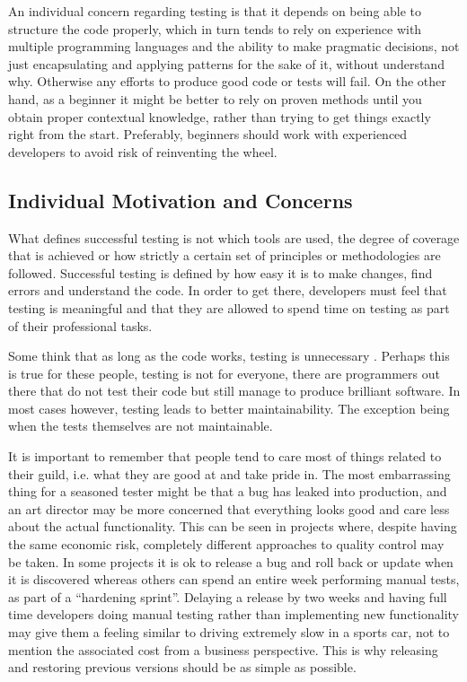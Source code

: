 \documentclass[11pt]{article}
\begin{document}
An individual concern regarding testing is that it depends on being able to structure the code properly, which in turn tends to rely on experience with multiple programming languages and the ability to make pragmatic decisions, not just encapsulating and applying patterns for the sake of it, without understand why. Otherwise any efforts to produce good code or tests will fail. %
On the other hand, as a beginner it might be better to rely on proven methods until you obtain proper contextual knowledge, rather than trying to get things exactly right from the start. Preferably, beginners should work with experienced developers to avoid risk of reinventing the wheel. \cite[questions~23-24]{Ahnve}


\subsection{Individual Motivation and Concerns}
\label{subsec:motivationconcerns}

What defines successful testing is not which tools are used, the degree of coverage that is achieved or how strictly a certain set of principles or methodologies are followed. Successful testing is defined by how easy it is to make changes, find errors and understand the code. In order to get there, developers must feel that testing is meaningful and that they are allowed to spend time on testing as part of their professional tasks.

Some think that as long as the code works, testing is unnecessary \cite[question~13]{Ahnve}. Perhaps this is true for these people, testing is not for everyone, there are programmers out there that do not test their code but still manage to produce brilliant software. In most cases however, testing leads to better maintainability. The exception being when the tests themselves are not maintainable. \cite[question~33]{Ahnve}\cite[question~28]{Edelstam}

It is important to remember that people tend to care most of things related to their guild, i.e. what they are good at and take pride in. The most embarrassing thing for a seasoned tester might be that a bug has leaked into production, and an art director may be more concerned that everything looks good and care less about the actual functionality. This can be seen in projects where, despite having the same economic risk, completely different approaches to quality control may be taken. In some projects it is ok to release a bug and roll back or update when it is discovered whereas others can spend an entire week performing manual tests, as part of a ``hardening sprint''. Delaying a release by two weeks and having full time developers doing manual testing rather than implementing new functionality may give them a feeling similar to driving extremely slow in a sports car, not to mention the associated cost from a business perspective. This is why releasing and restoring previous versions should be as simple as possible. \cite[question~38]{Ahnve}
\end{document}
